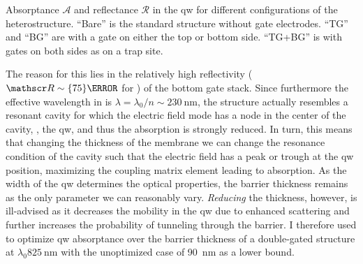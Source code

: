 \begin{margintable}
    \centering
    \footnotesize
    \caption{
        Absorptance $\mathscr{A}$ and reflectance $\mathscr{R}$ in the \gls{qw} for different configurations of the heterostructure.
        \enquote{Bare} is the standard structure without gate electrodes.
        \enquote{TG} and \enquote{BG} are with a gate on either the top or bottom side.
        \enquote{TG+BG} is with gates on both sides as on a trap site.
    }
    \label{tab:exp:tmm:absorptance_reflectance}
    
\end{margintable}

The reason for this lies in the relatively high reflectivity ($\reflectance\sim\qty{75}{\percent}$ for ) of the bottom gate stack.
Since furthermore the effective wavelength in  is $\lambda = \lambda_0/n\sim\qty{230}{\nano\meter}$, the structure actually resembles a resonant cavity for which the electric field mode has a node in the center of the cavity, \ie, the \gls{qw}, and thus the absorption is strongly reduced.
In turn, this means that changing the thickness of the membrane we can change the resonance condition of the cavity such that the electric field has a peak or trough at the \gls{qw} position, maximizing the coupling matrix element leading to absorption.
As the width of the \gls{qw} determines the optical properties, the  barrier thickness remains as the only parameter we can reasonably vary.
\emph{Reducing} the thickness, however, is ill-advised as it decreases the mobility in the \gls{qw} due to enhanced scattering and further increases the probability of tunneling through the barrier.
I therefore used \pymoosh to optimize \gls{qw} absorptance over the barrier thickness of a double-gated structure at $\lambda_0\qty{825}{\nano\meter}$ with the unoptimized case of \qty{90}{\nano\meter} as a lower bound.

